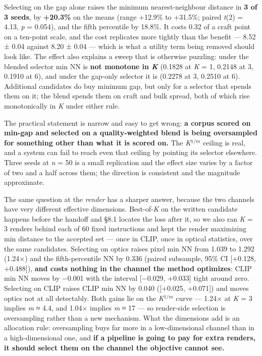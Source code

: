 \documentclass[
  10pt,
]{article}
\theoremstyle{plain}
\theoremstyle{definition}
\begin{document}
Selecting on the gap alone raises the minimum nearest-neighbour distance
in \textbf{3 of 3 seeds}, by \textbf{+20.3\%} on the means (range
+12.9\% to +31.5\%; paired \emph{t}(2) = 4.13, \emph{p} = 0.054), and
the fifth percentile by 18.8\%. It costs 0.32 of a craft point on a
ten-point scale, and the cost replicates more tightly than the benefit
--- 8.52 ± 0.04 against 8.20 ± 0.04 --- which is what a utility term
being removed should look like. The effect also explains a sweep that is
otherwise puzzling: under the blended selector min NN is \textbf{not
monotone in \emph{K}} (0.1828 at \emph{K} = 1, 0.2148 at 3, 0.1910 at
6), and under the gap-only selector it is (0.2278 at 3, 0.2510 at 6).
Additional candidates do buy minimum gap, but only for a selector that
spends them on it; the blend spends them on craft and bulk spread, both
of which rise monotonically in \emph{K} under either rule.

The practical statement is narrow and easy to get wrong: \textbf{a
corpus scored on min-gap and selected on a quality-weighted blend is
being oversampled for something other than what it is scored on.} The
\emph{K}\(^{1/m}\) ceiling is real, and a system can fail to reach even
that ceiling by pointing its selector elsewhere. Three seeds at \emph{n}
= 50 is a small replication and the effect size varies by a factor of
two and a half across them; the direction is consistent and the
magnitude approximate.

The same question at the \emph{render} has a sharper answer, because the
two channels have very different effective dimensions. Best-of-\emph{K}
on the written candidate happens before the handoff and §8.1 locates the
loss after it, so we also ran \emph{K} = 3 renders behind each of 60
fixed instructions and kept the render maximizing min distance to the
accepted set --- once in CLIP, once in optical statistics, over the same
candidates. Selecting on optics raises pixel min NN from 1.039 to 1.292
(1.24×) and the fifth-percentile NN by 0.336 (paired subsample, 95\% CI
{[}+0.128, +0.488{]}), \textbf{and costs nothing in the channel the
method optimizes}: CLIP min NN moves by −0.001 with the interval
{[}−0.029, +0.033{]} tight around zero. Selecting on CLIP raises CLIP
min NN by 0.040 ({[}+0.025, +0.071{]}) and moves optics not at all
detectably. Both gains lie on the \emph{K}\(^{1/m}\) curve --- 1.24× at
\emph{K} = 3 implies \emph{m} ≈ 4.4, and 1.04× implies \emph{m} ≈ 17 ---
so render-side selection is oversampling rather than a new mechanism.
What the dimensions add is an allocation rule: oversampling buys far
more in a low-dimensional channel than in a high-dimensional one, and
\textbf{if a pipeline is going to pay for extra renders, it should
select them on the channel the objective cannot see.}
\end{document}
